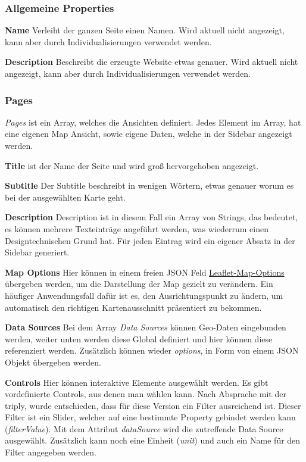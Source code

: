 \subsubsection{Allgemeine Properties}
\textbf{Name}
Verleiht der ganzen Seite einen Namen.
Wird aktuell nicht angezeigt, kann aber durch Individualisierungen verwendet werden.

\textbf{Description}
Beschreibt die erzeugte Website etwas genauer.
Wird aktuell nicht angezeigt, kann aber durch Individualisierungen verwendet werden.

\subsubsection{Pages}
\emph{Pages} ist ein Array, welches die Ansichten definiert.
Jedes Element im Array, hat eine eigenen Map Ansicht, sowie eigene Daten, welche in der Sidebar angezeigt werden.

\textbf{Title}
ist der Name der Seite und wird groß hervorgehoben angezeigt.

\textbf{Subtitle}
Der Subtitle beschreibt in wenigen Wörtern, etwas genauer worum es bei der ausgewählten Karte geht.

\textbf{Description}
Description ist in diesem Fall ein Array von Strings, das bedeutet, es können mehrere Texteinträge angeführt werden,
was wiederrum einen Designtechnischen Grund hat.
Für jeden Eintrag wird ein eigener Absatz in der Sidebar generiert.

\textbf{Map Options}
Hier können in einem freien JSON Feld \href{https://leafletjs.com/SlavaUkraini/reference.html#map-option}{Leaflet-Map-Options}
übergeben werden, um die Darstellung der Map gezielt zu verändern.
Ein häufiger Anwendungsfall dafür ist es, den Ausrichtungspunkt zu ändern, um automatisch den richtigen Kartenausschnitt präsentiert zu bekommen.

\textbf{Data Sources}
Bei dem Array \emph{Data Sources} können Geo-Daten eingebunden werden, weiter unten werden diese Global definiert und hier
können diese referenziert werden.
Zusätzlich können wieder \emph{options}, in Form von einem JSON Objekt übergeben werden.

\textbf{Controls}
Hier können interaktive Elemente ausgewählt werden.
Es gibt vordefinierte Controls, aus denen man wählen kann.
Nach Absprache mit der triply, wurde entschieden, dass für diese Version ein Filter ausreichend ist.
Dieser Filter ist ein Slider, welcher auf eine bestimmte Property gebindet werden kann (\emph{filterValue}).
Mit dem Attribut \emph{dataSource} wird die zutreffende Data Source ausgewählt.
Zusätzlich kann noch eine Einheit (\emph{unit}) und auch ein Name für den Filter angegeben werden.

